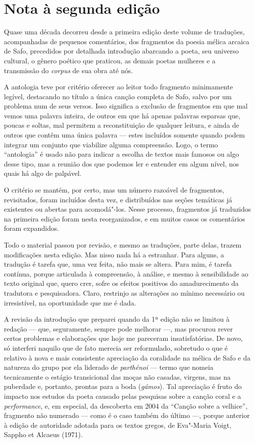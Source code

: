 \chapter{Nota à segunda edição}

Quase uma década decorreu desde a primeira edição deste volume de traduções,
acompanhadas de pequenos comentários, dos fragmentos da poesia mélica
arcaica de Safo, precedidos por detalhada introdução abarcando a poeta, seu
universo cultural, o gênero poético que praticou, as demais poetas
mulheres e a transmissão do \emph{corpus} de sua obra até nós.

A antologia teve por critério oferecer ao leitor todo fragmento
minimamente legível, destacando no título a única canção completa de Safo, salvo por um problema num de seus versos. Isso significa a exclusão de fragmentos em que mal
vemos uma palavra inteira, de outros em que há apenas
palavras esparsas que, poucas e soltas, mal permitem a reconstituição de
qualquer leitura, e ainda de outros que contêm uma única palavra ---
estes incluídos somente quando podem integrar um conjunto que viabilize
alguma compreensão. Logo, o termo ``antologia'' é usado não para indicar a escolha de textos mais famosos ou algo desse
tipo, mas a reunião dos que podemos ler e entender
em algum nível, nos quais há algo de palpável.

O critério se mantém, por certo, mas um número razoável de fragmentos, revisitados,
foram incluídos desta vez, e distribuídos nas seções temáticas já
existentes ou abertas para acomodá"-los. Nesse processo, fragmentos já traduzidos na primeira edição foram nesta reorganizados, e em muitos casos os comentários foram expandidos.

Todo o material passou por revisão, e mesmo as traduções, parte delas,
trazem modificações nesta edição. Mas nisso nada há a estranhar. Para alguns, a
tradução é tarefa que, uma vez feita, não mais se altera. Para mim,
é tarefa contínua, porque articulada à compreensão, à análise,
e mesmo à sensibilidade ao texto original que, quero crer, sofre os
efeitos positivos do amadurecimento da tradutora e pesquisadora. Claro, restrinjo as
alterações ao mínimo necessário ou irresistível, na oportunidade que
me é dada.

A revisão da introdução que preparei quando da 1ª edição não
se limitou à redação --- que, seguramente, sempre pode melhorar ---, mas
procurou rever certos problemas e elaborações que hoje me pareceram
insatisfatórias. De novo, só interferi naquilo que de fato merecia ser
reformulado, sobretudo o que é relativo à nova e mais consistente
apreciação da coralidade na mélica de Safo e da natureza do grupo por
ela liderado de \emph{parthénoi} --- termo que nomeia tecnicamente o
estágio transicional das moças não casadas, virgens, mas na puberdade
e, portanto, prontas para a boda (\emph{gámos}). Tal apreciação é fruto
do impacto nos estudos da poeta causado pelas pesquisas sobre a canção
coral e a \emph{performance}, e, em especial, da descoberta em 2004
da ``Canção sobre a velhice'', fragmento não numerado --- como é o caso também do último ---, porque anterior à edição de autoridade adotada para os textos gregos, de Eva"-Maria Voigt, Sappho et Alcaeus (1971).

